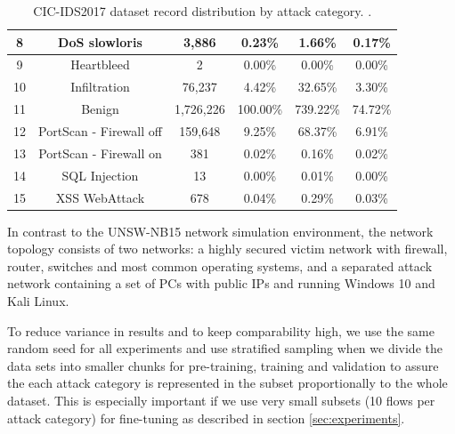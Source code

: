 \begin{table}[H]
{\begin{tabular}{cccccc}
		8  & DoS slowloris           & 3,886        & 0.23\%                 & 1.66\%                          & 0.17\%                    \\ \midrule
		9  & Heartbleed              & 2           & 0.00\%                 & 0.00\%                          & 0.00\%                    \\ \midrule
		10  & Infiltration            & 76,237       & 4.42\%                 & 32.65\%                         & 3.30\%                    \\ \midrule
		11 & Benign                  & 1,726,226     & 100.00\%               & 739.22\%                        & 74.72\%                   \\ \midrule
		12 & PortScan - Firewall off & 159,648      & 9.25\%                 & 68.37\%                         & 6.91\%                    \\ \midrule
		13 & PortScan - Firewall on  & 381         & 0.02\%                 & 0.16\%                          & 0.02\%                    \\ \midrule
		14 & SQL Injection           & 13          & 0.00\%                 & 0.01\%                          & 0.00\%                    \\ \midrule
		15 & XSS WebAttack           & 678         & 0.04\%                 & 0.29\%                          & 0.03\%                   
	\end{tabular}}
	\caption{CIC-IDS2017 dataset record distribution by attack category. \cite{cic_ids_2017_analysis}.}
	\label{table:methodology:datasets:cic_ids_2017_categories}
\end{table}

In contrast to the UNSW-NB15 network simulation environment, the network topology consists of two networks: a highly secured victim network with firewall, router, switches and most common operating systems, and a separated attack network containing a set of PCs with public IPs and running Windows 10 and Kali Linux.

To reduce variance in results and to keep comparability high, we use the same random seed for all experiments and use stratified sampling when we divide the data sets into smaller chunks for pre-training, training and validation to assure the each attack category is represented in the subset proportionally to the whole dataset. This is especially important if we use very small subsets (10 flows per attack category) for fine-tuning as described in section \ref{sec:experiments}. 

